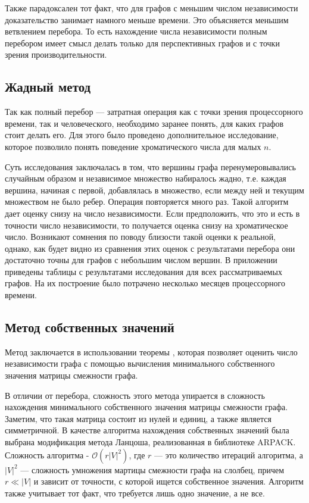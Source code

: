 Также парадоксален тот факт, что для графов с меньшим числом независимости
доказательство занимает намного меньше времени. Это объясняется меньшим
ветвлением перебора. То есть нахождение числа независимости полным перебором
имеет смысл делать только для перспективных графов и с точки зрения
производительности.


\subsection{Жадный метод}

Так как полный перебор --- затратная операция как с точки зрения процессорного
времени, так и человеческого, необходимо заранее понять, для каких графов стоит
делать его. Для этого было проведено дополнительное исследование, которое
позволило понять поведение хроматического числа для малых $n$.

Суть исследования заключалась в том, что вершины графа перенумеровывались
случайным образом и независимое множество набиралось жадно, т.е.
каждая вершина, начиная с первой, добавлялась в множество, если между ней и
текущим множеством не было ребер. Операция повторяется много раз.
Такой алгоритм дает оценку снизу на число независимости.
Если предположить, что это и есть в точности число
независимости, то получается оценка снизу на хроматическое число.
Возникают сомнения по поводу близости такой оценки к реальной, однако, как
будет видно из сравнения этих оценок с результатами перебора они достаточно
точны для графов с небольшим числом вершин.
В приложении  приведены таблицы с результатами исследования
для всех рассматриваемых графов. На их построение было потрачено несколько
месяцев процессорного времени.

\subsection{Метод собственных значений}

Метод заключается в использовании теоремы , которая позволяет
оценить число независимости графа с помощью вычисления минимального
собственного значения матрицы смежности графа.

В отличии от перебора, сложность этого метода упирается в сложность
нахождения минимального собственного значения матрицы смежности графа.
Заметим, что такая матрица состоит из нулей и единиц, а также является
симметричной. В качестве алгоритма нахождения собственных значений была
выбрана модификация метода Ланцоша, реализованная в библиотеке ARPACK.
Сложность алгоритма - $\mathcal O(r|V|^2)$,
где $r$ --- это количество итераций алгоритма, а $|V|^2$ --- сложность
умножения мартицы смежности графа на слолбец, причем $r \ll |V|$ и зависит от
точности, с которой ищется собственное значения. Алгоритм также учитывает тот
факт, что требуется лишь одно значение, а не все.

